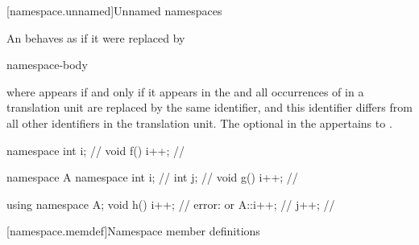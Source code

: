 [namespace.unnamed]{Unnamed namespaces}%

\pnum
An  behaves as if it were
replaced by
\begin{ncsimplebnf}
   \terminal{\{}  \terminal{\}}\br
{}   \terminal{;}\br
{}  \terminal{\{} namespace-body \terminal{\}}
\end{ncsimplebnf}
where
 appears if and only if it appears in the
and all occurrences of  in a translation unit are replaced by
the same identifier, and this identifier differs from all other
identifiers in the translation unit.
The optional 
in the 
appertains to .
\begin{example}
\begin{codeblock}
namespace { int i; }            // 
void f() { i++; }               // 

namespace A {
  namespace {
    int i;                      // 
    int j;                      // 
  }
  void g() { i++; }             // 
}

using namespace A;
void h() {
  i++;                          // error:  or 
  A::i++;                       // 
  j++;                          // 
}
\end{codeblock}
\end{example}

[namespace.memdef]{Namespace member definitions}%

